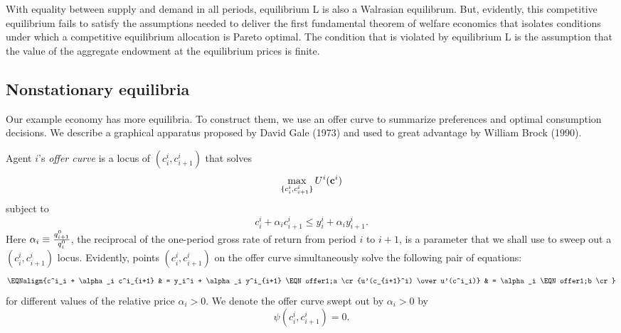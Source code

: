With equality between supply and demand in all
periods, equilibrium L is also a Walrasian equilibrum.
But, evidently, this competitive equilibrium
fails to satisfy
  the assumptions needed to deliver the
   first fundamental theorem of welfare economics that isolates conditions under which
 a competitive equilibrium allocation is Pareto
optimal.
  The condition that is violated by  equilibrium L
is the assumption that the value of the aggregate endowment
at the equilibrium prices is finite.

\subsection{Nonstationary equilibria}\label{sec:olg_nonstat}%

\noindent 
Our example economy has more  equilibria.
To construct  them, we use an offer curve to summarize preferences and optimal consumption
decisions.   We describe a graphical apparatus proposed
by David Gale (1973) and used  to great advantage by
William Brock (1990).
%
%

\medskip
{}  Agent $i$'s {\it offer curve} is
a locus of $(c_i^i, c^i_{i+1})$ that solves
$$ \max_{\{c_i^i, c^i_{i+1}\}} U^i({\bf c}^i)  $$
subject to
$$ c_i^i + \alpha_i c_{i+1}^i \leq y_i^i + \alpha_i y^i_{i+1} .$$
Here $\alpha_i \equiv {q^0_{i+1}\over q^0_i } $,
 the reciprocal
of the one-period gross rate of return from period $i$ to $i+1$,  is 
a parameter that we shall use to sweep out a $(c_i^i, c_{i+1}^i)$ locus.
\medskip
Evidently, points $(c_i^i, c_{i+1}^i)$ on
 the offer curve simultaneously solve the following pair of equations:
$$\EQNalign{c^i_i + \alpha_i c^i_{i+1} 
        & = y_i^i + \alpha_i y^i_{i+1} \EQN offer1;a  \cr
            {u'(c_{i+1}^i) \over u'(c^i_i)} & = \alpha_i   
                                        \EQN offer1;b  \cr}$$
for  different values of the relative price $\alpha_i > 0$.  
We denote the offer curve  swept out by $\alpha_i > 0 $  by
$$ \psi(c^i_i, c^i_{i+1}) = 0 .$$


